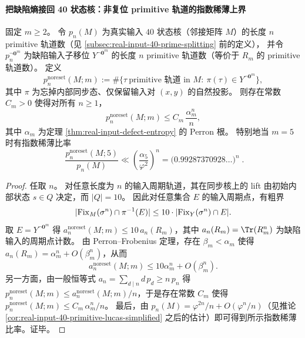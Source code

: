 \paragraph{把缺陷熵接回 40 状态核：非复位 primitive 轨道的指数稀薄上界}
\begin{theorem}\label{thm:real-input-40-nonreset-primes-thin}
固定 $m\ge 2$。
令 $p_n(M)$ 为真实输入 $40$ 状态核（邻接矩阵 $M$）的长度 $n$ primitive 轨道数（见 \ref{subsec:real-input-40-prime-splitting} 前的定义），
并令 $p_n^{\neg \mathbf{0}^m}$ 为缺陷输入子移位 $Y^{\neg \mathbf{0}^m}$ 的长度 $n$ primitive 轨道数（等价于 $R_m$ 的 primitive 轨道数）。
定义
\[
p_n^{\mathrm{noreset}}(M;m)
:=\#\{\tau\ \text{primitive 轨道 in }M:\ \pi(\tau)\in Y^{\neg \mathbf{0}^m}\},
\]
其中 $\pi$ 为忘掉内部同步态、仅保留输入对 $(x,y)$ 的自然投影。
则存在常数 $C_m>0$ 使得对所有 $n\ge 1$，
\[
p_n^{\mathrm{noreset}}(M;m)\le C_m\,\frac{\alpha_m^n}{n},
\]
其中 $\alpha_m$ 为定理 \ref{thm:real-input-defect-entropy} 的 Perron 根。
特别地当 $m=5$ 时有指数稀薄比率
\[
\boxed{\;
\frac{p_n^{\mathrm{noreset}}(M;5)}{p_n(M)}
\ll
\left(\frac{\alpha_5}{\varphi^2}\right)^n
=\bigl(0.99287370928\ldots\bigr)^n\; }.
\]
\end{theorem}
\begin{proof}
任取 $n$。
对任意长度为 $n$ 的输入周期轨道，其在同步核上的 lift 由初始内部状态 $s\in Q$ 决定，而 $|Q|=10$。
因此对任意集合 $E$ 的输入周期点，有粗界
\[
|{\rm Fix}_M(\sigma^n)\cap \pi^{-1}(E)|
\le 10\cdot |{\rm Fix}_Y(\sigma^n)\cap E|.
\]
取 $E=Y^{\neg \mathbf{0}^m}$ 得
\(
a_n^{\mathrm{noreset}}(M;m)\le 10\,a_n(R_m)
\)，其中 $a_n(R_m)=\Tr(R_m^n)$ 为缺陷输入的周期点计数。
由 Perron--Frobenius 定理，存在 $\beta_m<\alpha_m$ 使得
\(
a_n(R_m)=\alpha_m^n+O(\beta_m^n)
\)，从而
\[
a_n^{\mathrm{noreset}}(M;m)\le 10\alpha_m^n+O(\beta_m^n).
\]
另一方面，由一般恒等式 $a_n=\sum_{d\mid n} d\,p_d\ge n\,p_n$ 得
\(
p_n^{\mathrm{noreset}}(M;m)\le a_n^{\mathrm{noreset}}(M;m)/n
\)，于是存在常数 $C_m$ 使得
\(
p_n^{\mathrm{noreset}}(M;m)\le C_m\,\alpha_m^n/n
\)。
最后，由 $p_n(M)=\varphi^{2n}/n+O(\varphi^n/n)$（见推论 \ref{cor:real-input-40-primitive-lucas-simplified} 之后的估计）即可得到所示指数稀薄比率。证毕。
\end{proof}

